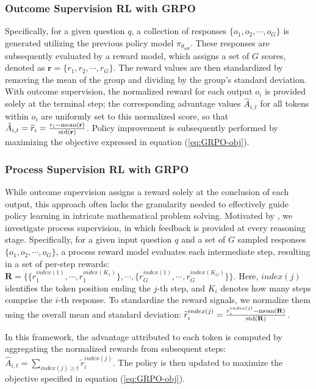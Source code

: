 \begin{itemize}[topsep=0pt]
\begin{itemize}[topsep=0pt]
\subsubsection{Outcome Supervision RL with GRPO} Specifically, for a given question $q$, a collection of responses $\{o_1, o_2, \cdots, o_G\}$ is generated utilizing the previous policy model $\pi_{\theta_{old}}$. These responses are subsequently evaluated by a reward model, which assigns a set of $G$ scores, denoted as $\mathbf{r} = \{r_1, r_2, \cdots, r_G\}$. The reward values are then standardized by removing the mean of the group and dividing by the group’s standard deviation. With outcome supervision, the normalized reward for each output $o_i$ is provided solely at the terminal step; the corresponding advantage values $\hat{A}_{i, t}$ for all tokens within $o_i$ are uniformly set to this normalized score, so that $\hat{A}_{i, t} = \widetilde{r}_i = \frac{r_i- {\rm mean}(\mathbf{r})}{{\rm std}(\mathbf{r})}$. Policy improvement is subsequently performed by maximizing the objective expressed in equation (\ref{eq:GRPO-obj}).

\subsubsection{Process Supervision RL with GRPO}  
While outcome supervision assigns a reward solely at the conclusion of each output, this approach often lacks the granularity needed to effectively guide policy learning in intricate mathematical problem solving. Motivated by \cite{wang2023math}, we investigate process supervision, in which feedback is provided at every reasoning stage. Specifically, for a given input question $q$ and a set of $G$ sampled responses $\{o_1, o_2, \cdots, o_G\}$, a process reward model evaluates each intermediate step, resulting in a set of per-step rewards: $\mathbf{R} = \{ \{r_1^{index(1)},\cdots,r_1^{index(K_1)}\}, \cdots,  \{r_G^{index(1)},\cdots,r_G^{index(K_G)}\} \}$. Here, $index(j)$ identifies the token position ending the $j$-th step, and $K_i$ denotes how many steps comprise the $i$-th response. To standardize the reward signals, we normalize them using the overall mean and standard deviation: $\widetilde{r}_i^{index(j)} = \frac{r_i^{index(j)} - {\rm mean(\mathbf{R})}}{{\rm std(\mathbf{R})}}$.

In this framework, the advantage attributed to each token is computed by aggregating the normalized rewards from subsequent steps: $\hat{A}_{i, t} = \sum_{index(j) \ge t} \widetilde{r}_i^{index(j)}$. The policy is then updated to maximize the objective specified in equation (\ref{eq:GRPO-obj}).


\end{itemize}
\end{itemize}
